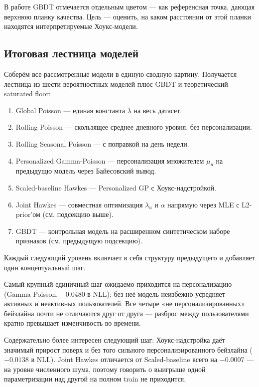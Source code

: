 \documentclass[12pt,a4paper]{article}
\begin{document}
В работе GBDT отмечается отдельным цветом --- как референсная точка, дающая верхнюю планку качества. Цель --- оценить, на каком расстоянии от этой планки находятся интерпретируемые Хоукс-модели.

\FloatBarrier
\subsection{Итоговая лестница моделей}

Соберём все рассмотренные модели в единую сводную картину. Получается лестница из шести вероятностных моделей плюс GBDT и теоретический saturated floor:

\begin{enumerate}
  \item Global Poisson --- единая константа $\bar{\lambda}$ на весь датасет.
  \item Rolling Poisson --- скользящее среднее дневного уровня, без персонализации.
  \item Rolling Seasonal Poisson --- с поправкой на день недели.
  \item Personalized Gamma-Poisson --- персонализация множителем $\mu _u$ на предыдущю модель через Байесовский вывод.
  \item Scaled-baseline Hawkes --- Personalized GP с Хоукс-надстройкой.
  \item Joint Hawkes --- совместная оптимизация $\lambda _u$ и $\alpha $ напрямую через MLE с L2-prior'ом (см. подсекцию выше).
  \item GBDT --- контрольная модель на расширенном синтетическом наборе признаков (см. предыдущую подсекцию).
\end{enumerate}


Каждый следующий уровень включает в себя структуру предыдущего и добавляет один концептуальный шаг.

Самый крупный единичный шаг ожидаемо приходится на персонализацию (Gamma-Poisson, $-0.0480$ в NLL): без неё модель неизбежно усредняет активных и неактивных пользователей. Все четыре «не персонализированных» бейзлайна почти не отличаются друг от друга --- разброс между пользователями кратно превышает изменчивость во времени.

Содержательно более интересен следующий шаг: Хоукс-надстройка даёт значимый прирост поверх и без того сильного персонализированного бейзлайна ($-0.0138$ в NLL). Joint Hawkes отличается от Scaled-baseline всего на $-0.0007$ --- на уровне численного шума, поэтому говорить о выигрыше одной параметризации над другой на полном train не приходится.
\end{document}
